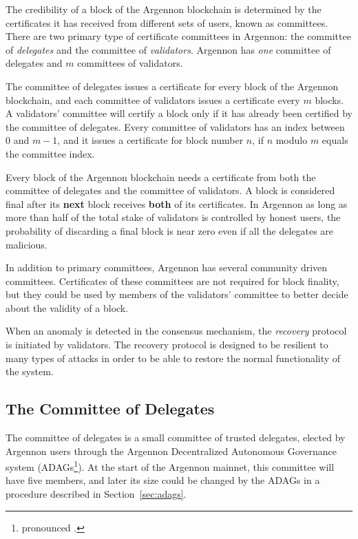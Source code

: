 
The credibility of a block of the Argennon blockchain is determined by the certificates it has received
from different sets of users, known as committees. There are two primary type of certificate committees in
Argennon: the committee of \emph{delegates} and the committee
of \emph{validators}. Argennon has \emph{one} committee of delegates and $m$ committees of validators.

The committee of delegates issues a certificate for every block of the Argennon blockchain, and each
committee of validators issues a certificate every $m$ blocks. A validators' committee will
certify a block only if it has already been certified by the committee of delegates. Every committee of validators has
an index between $0$ and $m - 1$, and it issues a certificate for block number $n$, if $n$ modulo $m$ equals
the committee index.

Every block of the Argennon blockchain needs a certificate from both the committee of delegates and
the committee of validators. A block is considered final after its \textbf{next} block receives \textbf{both} of
its certificates. In Argennon as long as more than half of the total stake of validators is controlled by honest users,
the probability of discarding a final block is near zero even if all the delegates are malicious.

In addition to primary committees, Argennon has several community driven committees. Certificates of these
committees are not required for block finality, but they could be used by members of the
validators' committee to better decide about the validity of a block.

When an anomaly is detected in the consensus mechanism, the \emph{recovery} protocol is initiated by validators. The
recovery protocol is designed to be resilient to many types of attacks in order to be able to restore the normal
functionality of the system.

\subsection{The Committee of Delegates}\label{subsec:the-committee-of-delegates}

The committee of delegates is a small committee of trusted delegates, elected by Argennon users through the
Argennon Decentralized Autonomous Governance system (ADAGs\footnote{pronounced .}).
At the start of the Argennon mainnet, this committee will have
five members, and later its size could be changed by the ADAGs in a procedure described
in Section~\ref{sec:adags}.

